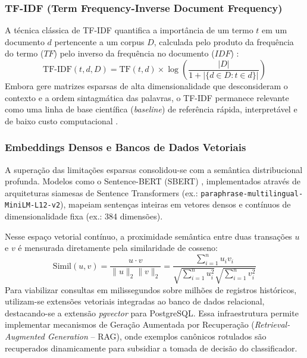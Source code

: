 \documentclass[
	12pt,				
	openright,			
	oneside,			
	a4paper,			
	english,			
	brazil				
	]{abntex2}
\begin{document}
\subsubsection{TF-IDF (Term Frequency-Inverse Document Frequency)}
A técnica clássica de TF-IDF quantifica a importância de um termo $t$ em um documento $d$ pertencente a um corpus $D$, calculada pelo produto da frequência do termo ($TF$) pelo inverso da frequência no documento ($IDF$) \cite{rajaraman2011mining}:
\begin{equation}
    \text{TF-IDF}(t, d, D) = \text{TF}(t, d) \times \log\left(\frac{|D|}{1 + |\{d \in D : t \in d\}|}\right)
\end{equation}
Embora gere matrizes esparsas de alta dimensionalidade que desconsideram o contexto e a ordem sintagmática das palavras, o TF-IDF permanece relevante como uma linha de base científica (\textit{baseline}) de referência rápida, interpretável e de baixo custo computacional \cite{santos2023classificacao}.

\subsubsection{Embeddings Densos e Bancos de Dados Vetoriais}
A superação das limitações esparsas consolidou-se com a semântica distribucional profunda. Modelos como o Sentence-BERT (SBERT) \cite{reimers2019sentence}, implementados através de arquiteturas siamesas de Sentence Transformers (ex.: \texttt{paraphrase-multilingual-MiniLM-L12-v2}), mapeiam sentenças inteiras em vetores densos e contínuos de dimensionalidade fixa (ex.: 384 dimensões).

Nesse espaço vetorial contínuo, a proximidade semântica entre duas transações $u$ e $v$ é mensurada diretamente pela similaridade de cosseno:
\begin{equation}
    \text{Simil}(u, v) = \frac{u \cdot v}{\|u\|_2 \|v\|_2} = \frac{\sum_{i=1}^{n} u_i v_i}{\sqrt{\sum_{i=1}^{n} u_i^2} \sqrt{\sum_{i=1}^{n} v_i^2}}
\end{equation}
Para viabilizar consultas em milissegundos sobre milhões de registros históricos, utilizam-se extensões vetoriais integradas ao banco de dados relacional, destacando-se a extensão \textit{pgvector} para PostgreSQL. Essa infraestrutura permite implementar mecanismos de Geração Aumentada por Recuperação (\textit{Retrieval-Augmented Generation} -- RAG), onde exemplos canônicos rotulados são recuperados dinamicamente para subsidiar a tomada de decisão do classificador.
\end{document}
